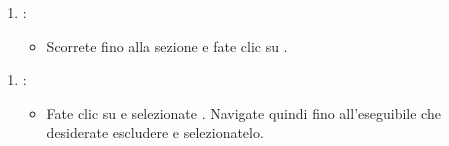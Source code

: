 \documentclass[letterpaper,10pt,italian]{sphinxmanual}
\begin{document}
\begin{figure}[htbp]
\centering

\noindent{}
\end{figure}
\begin{enumerate}
%
\setcounter{enumi}{3}
\item {} 
\sphinxAtStartPar
{}:
\begin{itemize}
\item {} 
\sphinxAtStartPar
Scorrete fino alla sezione  e fate clic su .

\end{itemize}

\end{enumerate}

\begin{figure}[htbp]
\centering

\noindent{}
\end{figure}
\begin{enumerate}
%
\setcounter{enumi}{4}
\item {} 
\sphinxAtStartPar
{}:
\begin{itemize}
\item {} 
\sphinxAtStartPar
Fate clic su  e selezionate . Navigate quindi fino all’eseguibile che desiderate escludere e selezionatelo.

\end{itemize}

\end{enumerate}

\begin{figure}[htbp]
\centering

\noindent{}
\end{figure}

\begin{figure}[htbp]
\centering

\noindent{}
\end{figure}

\begin{figure}[htbp]
\centering

\noindent{}
\end{figure}
\end{document}

